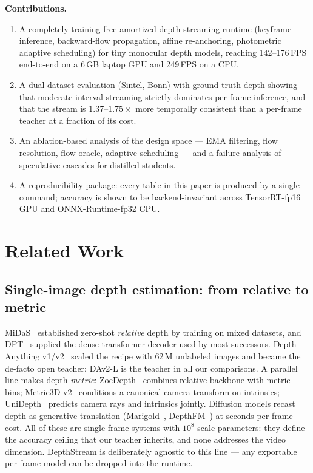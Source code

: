 \documentclass[10pt,twocolumn]{article}
\begin{document}
\noindent\textbf{Contributions.}
\begin{enumerate}
  \item A completely training-free amortized depth streaming runtime
  (keyframe inference, backward-flow propagation, affine re-anchoring,
  photometric adaptive scheduling) for tiny monocular depth models, reaching
  142--176\,FPS end-to-end on a 6\,GB laptop GPU and 249\,FPS on a CPU.
  \item A dual-dataset evaluation (Sintel, Bonn) with ground-truth depth
  showing that moderate-interval streaming strictly dominates per-frame
  inference, and that the stream is $1.37$--$1.75\times$ more temporally
  consistent than a per-frame teacher at a fraction of its cost.
  \item An ablation-based analysis of the design space --- EMA filtering,
  flow resolution, flow oracle, adaptive scheduling --- and a failure analysis
  of speculative cascades for distilled students.
  \item A reproducibility package: every table in this paper is produced by a
  single command; accuracy is shown to be backend-invariant across
  TensorRT-fp16 GPU and ONNX-Runtime-fp32 CPU.
\end{enumerate}

\section{Related Work}
\label{sec:related}

\subsection{Single-image depth estimation: from relative to metric}
MiDaS~\cite{midas} established zero-shot \emph{relative} depth by training on
mixed datasets, and DPT~\cite{dpt} supplied the dense transformer decoder used
by most successors. Depth Anything v1/v2~\cite{da1,dav2} scaled the recipe
with 62\,M unlabeled images and became the de-facto open teacher; DAv2-L is
the teacher in all our comparisons. A parallel line makes depth
\emph{metric}: ZoeDepth~\cite{zoedepth} combines relative backbone with
metric bins; Metric3D v2~\cite{metric3d} conditions a canonical-camera
transform on intrinsics; UniDepth~\cite{unidepth} predicts camera rays and
intrinsics jointly. Diffusion models recast depth as generative translation
(Marigold~\cite{marigold}, DepthFM~\cite{depthfm}) at seconds-per-frame cost.
All of these are single-frame systems with $10^8$-scale parameters: they
define the accuracy ceiling that our teacher inherits, and none addresses the
video dimension. DepthStream is deliberately agnostic to this line --- any
exportable per-frame model can be dropped into the runtime.
\end{document}
